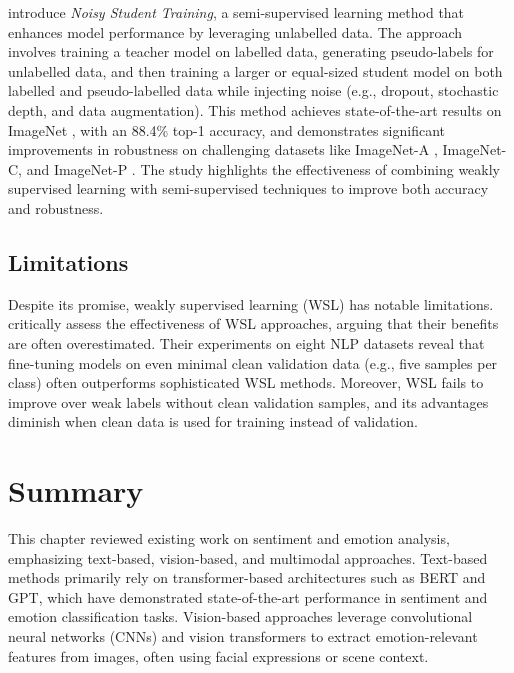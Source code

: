 \citet{xie_self-training_2020} introduce \emph{Noisy Student Training}, a semi-supervised learning method that enhances model performance by leveraging unlabelled data. The approach involves training a teacher model on labelled data, generating pseudo-labels for unlabelled data, and then training a larger or equal-sized student model on both labelled and pseudo-labelled data while injecting noise (e.g., dropout, stochastic depth, and data augmentation). This method achieves state-of-the-art results on ImageNet \cite{5206848}, with an 88.4\% top-1 accuracy, and demonstrates significant improvements in robustness on challenging datasets like ImageNet-A \cite{hendrycks2021naturaladversarialexamples}, ImageNet-C, and ImageNet-P \cite{hendrycks2019benchmarkingneuralnetworkrobustness}. The study highlights the effectiveness of combining weakly supervised learning with semi-supervised techniques to improve both accuracy and robustness.


\subsection*{Limitations}

Despite its promise, weakly supervised learning (WSL) has notable limitations. \citet{zhu_weaker_2023} critically assess the effectiveness of WSL approaches, arguing that their benefits are often overestimated. Their experiments on eight NLP datasets reveal that fine-tuning models on even minimal clean validation data (e.g., five samples per class) often outperforms sophisticated WSL methods. Moreover, WSL fails to improve over weak labels without clean validation samples, and its advantages diminish when clean data is used for training instead of validation. 


\section{Summary}
\label{sec:summary}
This chapter reviewed existing work on sentiment and emotion analysis, emphasizing text-based, vision-based, and multimodal approaches. Text-based methods primarily rely on transformer-based architectures such as BERT and GPT, which have demonstrated state-of-the-art performance in sentiment and emotion classification tasks. Vision-based approaches leverage convolutional neural networks (CNNs) and vision transformers to extract emotion-relevant features from images, often using facial expressions or scene context.
\newline

